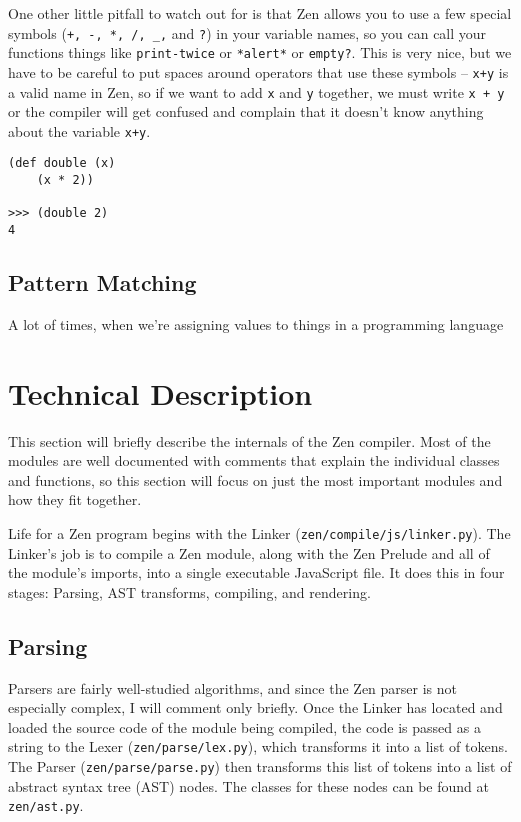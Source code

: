 \documentclass{article}
\begin{document}
One other little pitfall to watch out for is that Zen allows you to use a few special symbols (\lstinline{+, -, *, /, _,} and \lstinline{?}) in your variable names, so you can call your functions things like \lstinline{print-twice} or \lstinline{*alert*} or \lstinline{empty?}. This is very nice, but we have to be careful to put spaces around operators that use these symbols -- \lstinline{x+y} is a valid name in Zen, so if we want to add \lstinline{x} and \lstinline{y} together, we must write \lstinline{x + y} or the compiler will get confused and complain that it doesn't know anything about the variable \lstinline{x+y}.

\begin{lstlisting}
(def double (x)
	(x * 2))
	
>>> (double 2)
4
\end{lstlisting}


\subsection{Pattern Matching}
A lot of times, when we're assigning values to things in a programming language



\section{Technical Description}

This section will briefly describe the internals of the Zen compiler. Most of the modules are well documented with comments that explain the individual classes and functions, so this section will focus on just the most important modules and how they fit together.

Life for a Zen program begins with the Linker (\lstinline{zen/compile/js/linker.py}). The Linker's job is to compile a Zen module, along with the Zen Prelude and all of the module's imports, into a single executable JavaScript file. It does this in four stages: Parsing, AST transforms, compiling, and rendering.

\subsection{Parsing}
Parsers are fairly well-studied algorithms, and since the Zen parser is not especially complex, I will comment only briefly. Once the Linker has located and loaded the source code of the module being compiled, the code is passed as a string to the Lexer (\lstinline{zen/parse/lex.py}), which transforms it into a list of tokens. The Parser (\lstinline{zen/parse/parse.py}) then transforms this list of tokens into a list of abstract syntax tree (AST) nodes. The classes for these nodes can be found at \lstinline{zen/ast.py}.
\end{document}
